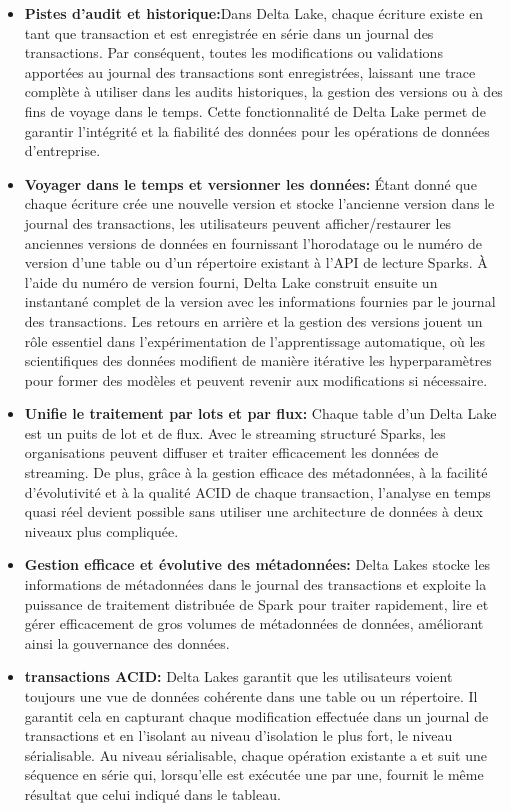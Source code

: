 \begin{itemize}
	\item[\textbullet] \textbf{Pistes d'audit et historique:}Dans Delta Lake, chaque écriture existe en tant que transaction et est enregistrée en série dans un journal des transactions. Par conséquent, toutes les modifications ou validations apportées au journal des transactions sont enregistrées, laissant une trace complète à utiliser dans les audits historiques, la gestion des versions ou à des fins de voyage dans le temps. Cette fonctionnalité de Delta Lake permet de garantir l'intégrité et la fiabilité des données pour les opérations de données d'entreprise.
	\item[\textbullet] \textbf{Voyager dans le temps et versionner les données:} Étant donné que chaque écriture crée une nouvelle version et stocke l'ancienne version dans le journal des transactions, les utilisateurs peuvent afficher/restaurer les anciennes versions de données en fournissant l'horodatage ou le numéro de version d'une table ou d'un répertoire existant à l'API de lecture Sparks\@. À l'aide du numéro de version fourni, Delta Lake construit ensuite un instantané complet de la version avec les informations fournies par le journal des transactions. Les retours en arrière et la gestion des versions jouent un rôle essentiel dans l'expérimentation de l'apprentissage automatique, où les scientifiques des données modifient de manière itérative les hyperparamètres pour former des modèles et peuvent revenir aux modifications si nécessaire.
	\item[\textbullet] \textbf{Unifie le traitement par lots et par flux:} Chaque table d'un Delta Lake est un puits de lot et de flux. Avec le streaming structuré Sparks, les organisations peuvent diffuser et traiter efficacement les données de streaming. De plus, grâce à la gestion efficace des métadonnées, à la facilité d'évolutivité et à la qualité ACID de chaque transaction, l'analyse en temps quasi réel devient possible sans utiliser une architecture de données à deux niveaux plus compliquée.
	\item[\textbullet] \textbf{Gestion efficace et évolutive des métadonnées:} Delta Lakes stocke les informations de métadonnées dans le journal des transactions et exploite la puissance de traitement distribuée de Spark pour traiter rapidement, lire et gérer efficacement de gros volumes de métadonnées de données, améliorant ainsi la gouvernance des données.
	\item[\textbullet] \textbf{transactions ACID:} Delta Lakes garantit que les utilisateurs voient toujours une vue de données cohérente dans une table ou un répertoire. Il garantit cela en capturant chaque modification effectuée dans un journal de transactions et en l'isolant au niveau d'isolation le plus fort, le niveau sérialisable. Au niveau sérialisable, chaque opération existante a et suit une séquence en série qui, lorsqu'elle est exécutée une par une, fournit le même résultat que celui indiqué dans le tableau.

\end{itemize}
